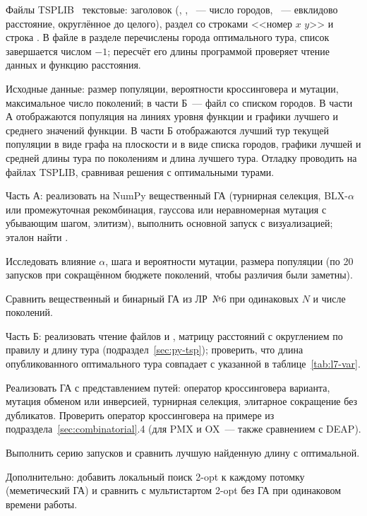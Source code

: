 Файлы TSPLIB~\cite{reinelt1991} текстовые: заголовок (, , ~---
число городов, ~--- евклидово расстояние, округлённое до целого),
раздел  со строками <<номер $x$ $y$>> и строка . В файле
 в разделе  перечислены города оптимального тура, список
завершается числом $-1$; пересчёт его длины программой проверяет чтение данных и функцию расстояния.

Исходные данные: размер популяции, вероятности кроссинговера и мутации, максимальное число поколений; в
части Б~--- файл  со списком городов. В части А отображаются популяция на линиях уровня
функции и графики лучшего и среднего значений функции. В части Б отображаются лучший тур текущей
популяции в виде графа на плоскости и в виде списка городов, графики лучшей и средней длины тура по
поколениям и длина лучшего тура. Отладку проводить на файлах TSPLIB, сравнивая решения с оптимальными
турами.

\begin{steps}
\item Часть А: реализовать на NumPy вещественный ГА (турнирная селекция, BLX-$\alpha$ или
промежуточная рекомбинация, гауссова или неравномерная мутация с убывающим шагом, элитизм), выполнить
основной запуск с визуализацией; эталон найти .
\item Исследовать влияние $\alpha$, шага и вероятности мутации, размера популяции (по 20 запусков при
сокращённом бюджете поколений, чтобы различия были заметны).
\item Сравнить вещественный и бинарный ГА из ЛР~№6 при одинаковых $N$ и числе поколений.
\item Часть Б: реализовать чтение файлов  и , матрицу расстояний с
округлением по правилу  и длину тура (подраздел~\ref{sec:py-tsp}); проверить, что длина опубликованного оптимального тура
совпадает с указанной в таблице~\ref{tab:l7-var}.
\item Реализовать ГА с представлением путей: оператор кроссинговера варианта, мутация обменом или
инверсией, турнирная селекция, элитарное сокращение без дубликатов. Проверить оператор кроссинговера на
примере из подраздела~\ref{sec:combinatorial}.4 (для PMX и OX~--- также сравнением с DEAP).
\item Выполнить серию запусков и сравнить лучшую найденную длину с оптимальной.
\item Дополнительно: добавить локальный поиск 2-opt к каждому потомку (меметический ГА) и сравнить с
мультистартом 2-opt без ГА при одинаковом времени работы.
\end{steps}

